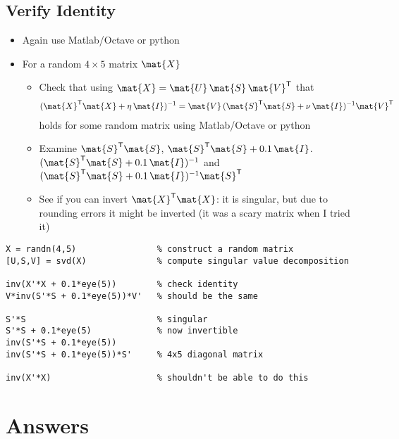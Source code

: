 \documentclass[11pt]{article}
\newcommand{\tr}{\textsf{T}}
\begin{document}
\subsection{Verify Identity}
\label{sec:orga97e89e}
\begin{itemize}
\item Again use Matlab/Octave or python
\item For a random \(4\times5\) matrix \(\mat{X}\)
\begin{itemize}
\item Check that using \(\mat{X} = \mat{U}\,\mat{S}\,\mat{V}^\tr\) that
\begin{align*}
 (\mat{X}^\tr\mat{X} + \eta\,\mat{I})^{-1} 
  = \mat{V}\,(\mat{S}^\tr\mat{S}+\nu\,\mat{I})^{-1}\mat{V}^\tr
\end{align*}
holds for some random matrix using Matlab/Octave or python
\item Examine \(\mat{S}^\tr\mat{S}\), \(\mat{S}^\tr\mat{S}+0.1\,\mat{I}\).
\((\mat{S}^\tr\mat{S}+0.1\,\mat{I})^{-1}\) and
\((\mat{S}^\tr\mat{S}+0.1\,\mat{I})^{-1} \mat{S}^\tr\)
\item See if you can invert \(\mat{X}^\tr\mat{X}\): it is singular,
but due to rounding errors it might be inverted (it was a scary
matrix when I tried it)
\end{itemize}
\end{itemize}

\begin{verbatim}
X = randn(4,5)                % construct a random matrix
[U,S,V] = svd(X)              % compute singular value decomposition

inv(X'*X + 0.1*eye(5))        % check identity
V*inv(S'*S + 0.1*eye(5))*V'   % should be the same

S'*S                          % singular
S'*S + 0.1*eye(5)             % now invertible
inv(S'*S + 0.1*eye(5))        
inv(S'*S + 0.1*eye(5))*S'     % 4x5 diagonal matrix

inv(X'*X)                     % shouldn't be able to do this
\end{verbatim}

\section{Answers}
\label{sec:org80a2817}
\end{document}
